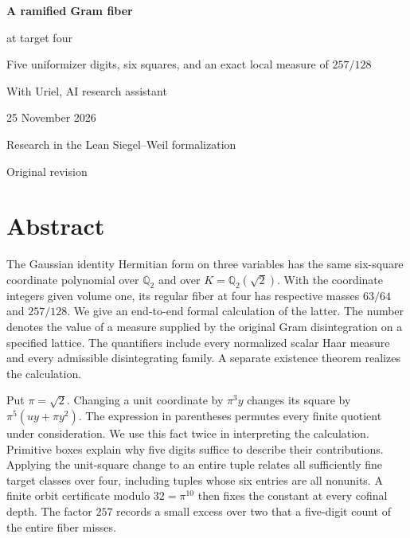 \documentclass[12pt,letterpaper]{article}
\newcommand{\code}[1]{\texttt{\detokenize{#1}}}
\begin{document}

\thispagestyle{empty}
\begin{center}\par\vspace{.52in}
{\fontsize{32}{38}\selectfont\bfseries\color{ink}A ramified Gram fiber\par at target four}\par\vspace{.23in}
\begin{minipage}{.83\linewidth}\centering\Large Five uniformizer digits, six squares, and an exact local measure of $257/128$\end{minipage}
\par\vspace{.55in}{\large Justin Candler}\par With Uriel, AI research assistant\par 25 November 2026
\par\vspace{.34in}\end{center}\vfill
\begin{center}\sffamily Research in the Lean Siegel--Weil formalization\par\small Original revision \code{40e56bab}\end{center}
\clearpage\section*{Abstract}
The Gaussian identity Hermitian form on three variables has the same six-square coordinate polynomial over $\mathbb Q_2$ and over $K=\mathbb Q_2(\sqrt2)$. With the coordinate integers given volume one, its regular fiber at four has respective masses $63/64$ and $257/128$. We give an end-to-end formal calculation of the latter. The number denotes the value of a measure supplied by the original Gram disintegration on a specified lattice. The quantifiers include every normalized scalar Haar measure and every admissible disintegrating family. A separate existence theorem realizes the calculation.
\par
Put $\pi=\sqrt2$. Changing a unit coordinate by $\pi^3y$ changes its square by $\pi^5(uy+\pi y^2)$. The expression in parentheses permutes every finite quotient under consideration. We use this fact twice in interpreting the calculation. Primitive boxes explain why five digits suffice to describe their contributions. Applying the unit-square change to an entire tuple relates all sufficiently fine target classes over four, including tuples whose six entries are all nonunits. A finite orbit certificate modulo $32=\pi^{10}$ then fixes the constant at every cofinal depth. The factor $257$ records a small excess over two that a five-digit count of the entire fiber misses.
\end{document}
